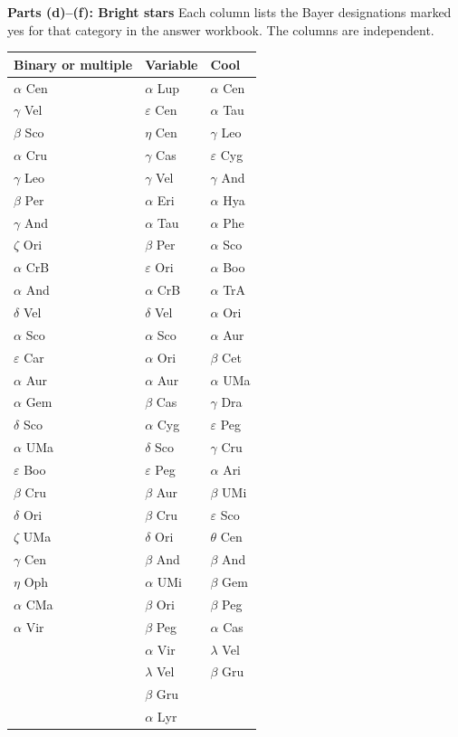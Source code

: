 \textbf{Parts (d)--(f): Bright stars}
Each column lists the Bayer designations marked yes for that category in the answer workbook. The columns are independent.
\begin{longtable}{@{}lll@{}}
\toprule
Binary or multiple & Variable & Cool\\
\midrule
\endhead
\bottomrule
\endfoot
\(\alpha\) Cen & \(\alpha\) Lup & \(\alpha\) Cen\\
\(\gamma\) Vel & \(\varepsilon\) Cen & \(\alpha\) Tau\\
\(\beta\) Sco & \(\eta\) Cen & \(\gamma\) Leo\\
\(\alpha\) Cru & \(\gamma\) Cas & \(\varepsilon\) Cyg\\
\(\gamma\) Leo & \(\gamma\) Vel & \(\gamma\) And\\
\(\beta\) Per & \(\alpha\) Eri & \(\alpha\) Hya\\
\(\gamma\) And & \(\alpha\) Tau & \(\alpha\) Phe\\
\(\zeta\) Ori & \(\beta\) Per & \(\alpha\) Sco\\
\(\alpha\) CrB & \(\varepsilon\) Ori & \(\alpha\) Boo\\
\(\alpha\) And & \(\alpha\) CrB & \(\alpha\) TrA\\
\(\delta\) Vel & \(\delta\) Vel & \(\alpha\) Ori\\
\(\alpha\) Sco & \(\alpha\) Sco & \(\alpha\) Aur\\
\(\varepsilon\) Car & \(\alpha\) Ori & \(\beta\) Cet\\
\(\alpha\) Aur & \(\alpha\) Aur & \(\alpha\) UMa\\
\(\alpha\) Gem & \(\beta\) Cas & \(\gamma\) Dra\\
\(\delta\) Sco & \(\alpha\) Cyg & \(\varepsilon\) Peg\\
\(\alpha\) UMa & \(\delta\) Sco & \(\gamma\) Cru\\
\(\varepsilon\) Boo & \(\varepsilon\) Peg & \(\alpha\) Ari\\
\(\beta\) Cru & \(\beta\) Aur & \(\beta\) UMi\\
\(\delta\) Ori & \(\beta\) Cru & \(\varepsilon\) Sco\\
\(\zeta\) UMa & \(\delta\) Ori & \(\theta\) Cen\\
\(\gamma\) Cen & \(\beta\) And & \(\beta\) And\\
\(\eta\) Oph & \(\alpha\) UMi & \(\beta\) Gem\\
\(\alpha\) CMa & \(\beta\) Ori & \(\beta\) Peg\\
\(\alpha\) Vir & \(\beta\) Peg & \(\alpha\) Cas\\
 & \(\alpha\) Vir & \(\lambda\) Vel\\
 & \(\lambda\) Vel & \(\beta\) Gru\\
 & \(\beta\) Gru & \\
 & \(\alpha\) Lyr & \\
\end{longtable}
